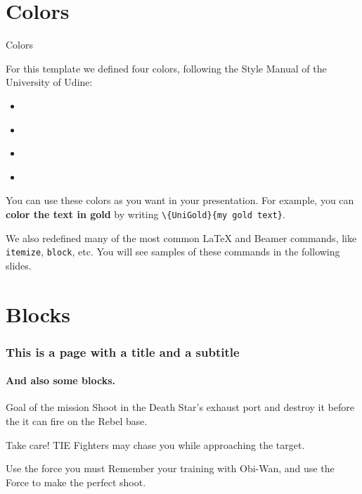 \documentclass{article}
\begin{document}
\section{Colors}

\begin{frame}{Colors}

For this template we defined four colors, following the Style Manual of the University of Udine:
\begin{itemize}
\item \textcolor{white}{}
\item \textcolor{white}{}
\item \textcolor{white}{}
\item \textcolor{white}{}
\end{itemize}

\vskip 0.5cm

You can use these colors as you want in your presentation. For example, you can \textbf{\textcolor{UniGold}{color the text in gold}} by writing \texttt{\textbackslash\{UniGold\}\{my gold text\}}.

\vskip 0.5cm

We also redefined many of the most common \LaTeX{} and Beamer commands, like \texttt{itemize}, \texttt{block}, etc. You will see samples of these commands in the following slides.

\end{frame}

\section{Blocks}

\begin{frame} 
\frametitle{This is a page with a title and a subtitle} 
\framesubtitle{And also some blocks.} 
\begin{block}{Goal of the mission}
Shoot in the Death Star's exhaust port and destroy it before the it can fire on the Rebel base.
\end{block} 
\begin{alertblock}{Take care!}
TIE Fighters may chase you while approaching the target.
\end{alertblock} 
\begin{exampleblock}{Use the force you must}
Remember your training with Obi-Wan, and use the Force to make the perfect shoot.
\end{exampleblock} 

\end{frame}
\end{document}
